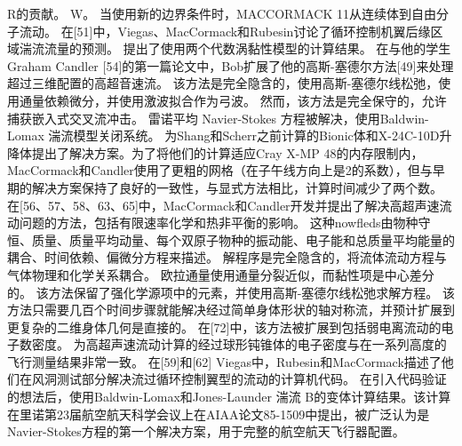 \documentclass[UTF8,11pt,a4paper,openany,fontset=fandol]{ctexbook}
\begin{document}
R的贡献。 W。 当使用新的边界条件时，MACCORMACK 11从连续体到自由分子流动。 在[51]中，Viegas、MacCormack和Rubesin讨论了循环控制机翼后缘区域湍流流量的预测。 提出了使用两个代数涡黏性模型的计算结果。 在与他的学生Graham Candler [54]的第一篇论文中，Bob扩展了他的高斯-塞德尔方法[49]来处理超过三维配置的高超音速流。 该方法是完全隐含的，使用高斯-塞德尔线松弛，使用通量依赖微分，并使用激波拟合作为弓波。 然而，该方法是完全保守的，允许捕获嵌入式交叉流冲击。 雷诺平均 Navier-Stokes 方程被解决，使用Baldwin-Lomax 湍流模型关闭系统。 为Shang和Scherr之前计算的Bionic体和X-24C-10D升降体提出了解决方案。为了将他们的计算适应Cray X-MP 48的内存限制内，MacCormack和Candler使用了更粗的网格（在子午线方向上是2的系数），但与早期的解决方案保持了良好的一致性，与显式方法相比，计算时间减少了两个数。 在[56、57、58、63、65]中，MacCormack和Candler开发并提出了解决高超声速流动问题的方法，包括有限速率化学和热非平衡的影响。 这种nowfleds由物种守恒、质量、质量平均动量、每个双原子物种的振动能、电子能和总质量平均能量的耦合、时间依赖、偏微分方程来描述。 解程序是完全隐含的，将流体流动方程与气体物理和化学关系耦合。 欧拉通量使用通量分裂近似，而黏性项是中心差分的。 该方法保留了强化学源项中的元素，并使用高斯-塞德尔线松弛求解方程。 该方法只需要几百个时间步骤就能解决经过简单身体形状的轴对称流，并预计扩展到更复杂的二维身体几何是直接的。 在[72]中，该方法被扩展到包括弱电离流动的电子数密度。 为高超声速流动计算的经过球形钝锥体的电子密度与在一系列高度的飞行测量结果非常一致。 在[59]和[62] Viegas中，Rubesin和MacCormack描述了他们在风洞测试部分解决流过循环控制翼型的流动的计算机代码。 在引入代码验证的想法后，使用Baldwin-Lomax和Jones-Launder 湍流 B的变体计算结果。该计算在里诺第23届航空航天科学会议上在AIAA论文85-1509中提出，被广泛认为是Navier-Stokes方程的第一个解决方案，用于完整的航空航天飞行器配置。
\end{document}
